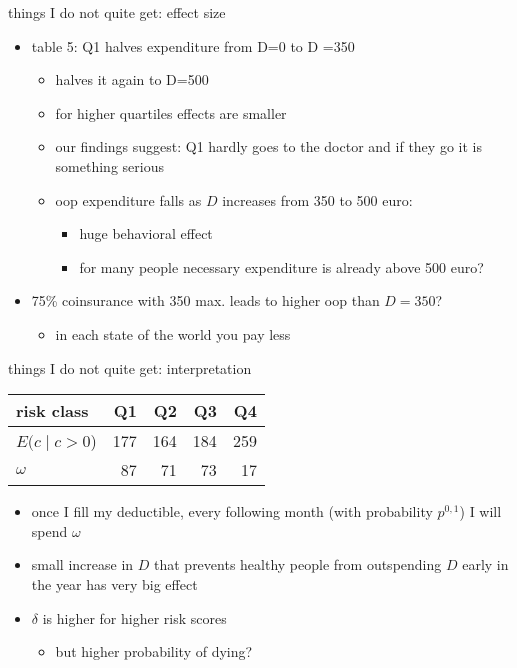 \documentclass[presentation]{beamer}
\begin{document}
\begin{frame}[label={sec:org8bb453d}]{things I do not quite get: effect size}
\begin{itemize}
\item table 5: Q1 halves expenditure from D=0 to D =350
\begin{itemize}
\item halves it again to D=500
\item for higher quartiles effects are smaller
\item our findings suggest: Q1 hardly goes to the doctor and if they go it is something serious
\end{itemize}
\begin{itemize}
\item oop expenditure falls as \(D\) increases from 350 to 500 euro:
\begin{itemize}
\item huge behavioral effect
\item for many people necessary expenditure is already above 500 euro?
\end{itemize}
\end{itemize}
\item 75\% coinsurance with 350 max. leads to higher oop than \(D=350\)?
\begin{itemize}
\item in each state of the world you pay less
\end{itemize}
\end{itemize}
\end{frame}


\begin{frame}[label={sec:orgf893629}]{things I do not quite get: interpretation}
\begin{center}
\begin{tabular}{lrrrr}
risk class & Q1 & Q2 & Q3 & Q4\\[0pt]
\hline
\(E(c \mid c>0\)) & 177 & 164 & 184 & 259\\[0pt]
\(\omega\) & 87 & 71 & 73 & 17\\[0pt]
\end{tabular}
\end{center}

\begin{itemize}
\item once I fill my deductible, every following month (with probability \(p^{0,1}\))  I will spend \(\omega\)
\item small increase in \(D\) that prevents healthy people from outspending \(D\) early in the year has very big effect
\item \(\delta\) is higher for higher risk scores
\begin{itemize}
\item but higher probability of dying?
\end{itemize}
\end{itemize}
\end{frame}
\end{document}
